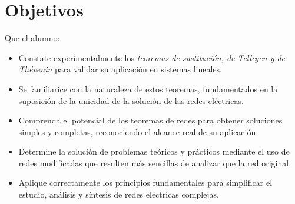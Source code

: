 \section{Objetivos}

Que el alumno:
\begin{itemize}
	\item Constate experimentalmente los \textit{teoremas de sustitución, de Tellegen y de Thévenin} para validar su aplicación en sistemas lineales.
	\item Se familiarice con la naturaleza de estos teoremas, fundamentados en la suposición de la unicidad de la solución de las redes eléctricas.
	\item Comprenda el potencial de los teoremas de redes para obtener soluciones simples y completas, reconociendo el alcance real de su aplicación.
	\item Determine la solución de problemas teóricos y prácticos mediante el uso de redes modificadas que resulten más sencillas de analizar que la red original.
	\item Aplique correctamente los principios fundamentales para simplificar el estudio, análisis y síntesis de redes eléctricas complejas.
\end{itemize}